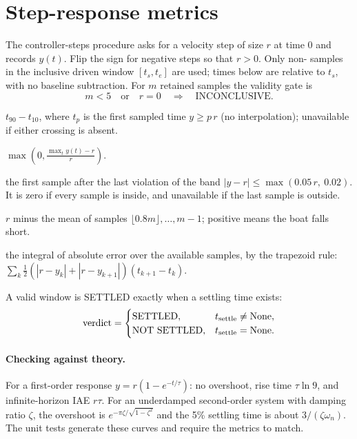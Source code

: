 \section{Step-response metrics}
\label{sec:step}

The controller-steps procedure asks for a velocity step of size $r$ at time $0$
and records $y(t)$. Flip the sign for negative steps so that $r>0$.
Only non- samples in the inclusive driven window $[t_s,t_e]$
are used; times below are relative to $t_s$, with no baseline subtraction.
For $m$ retained samples the validity gate is
\[
  m<5\quad\text{or}\quad r=0\quad\Longrightarrow\quad\text{INCONCLUSIVE}.
\]
\begin{description}[nosep]
  \item[Rise time] $t_{90} - t_{10}$, where $t_{p}$ is the first sampled time $y\ge p\,r$
        (no interpolation); unavailable if either crossing is absent.
  \item[Overshoot] $\max\!\left(0, \frac{\max_t y(t) - r}{r}\right)$.
  \item[Settling time] the first sample after the last violation of the band
        $|y-r|\le\max(0.05\,r,\ 0.02)$. It is zero if every sample is inside, and
        unavailable if the last sample is outside.
  \item[Steady-state error] $r$ minus the mean of samples $\lfloor0.8m\rfloor,\ldots,m-1$;
        positive means the boat falls short.
  \item[IAE] the integral of absolute error over the available samples, by the trapezoid rule:
        $\sum_k \tfrac12\left(|r-y_k| + |r-y_{k+1}|\right)(t_{k+1}-t_k)$.
\end{description}

A valid window is SETTLED exactly when a settling time exists:
\[
 \text{verdict}=\begin{cases}\text{SETTLED},&t_{\rm settle}\ne\text{None},\\
 \text{NOT SETTLED},&t_{\rm settle}=\text{None}.\end{cases}
\]

\paragraph{Checking against theory.} For a first-order response
$y = r(1-e^{-t/\tau})$: no overshoot, rise time $\tau\ln 9$, and infinite-horizon IAE
$r\tau$. For an underdamped second-order system with damping ratio $\zeta$, the
overshoot is $e^{-\pi\zeta/\sqrt{1-\zeta^2}}$ and the 5\% settling time is about
$3/(\zeta\omega_n)$. The unit tests generate these curves and require the
metrics to match.
